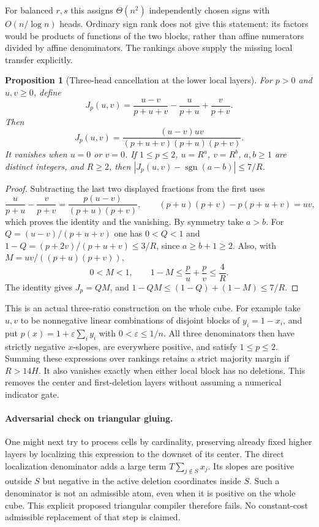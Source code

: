 \documentclass[11pt]{article}
\newtheorem{proposition}{Proposition}
\begin{document}
For balanced $r,s$ this assigns $\Theta(n^2)$ independently chosen
signs with $O(n/\log n)$ heads. Ordinary sign rank does not give this
statement: its factors would be products of functions of the two
blocks, rather than affine numerators divided by affine denominators.
The rankings above supply the missing local transfer explicitly.

\begin{proposition}[Three-head cancellation at the lower local layers]
For $p>0$ and $u,v\geq0$, define
\[
 J_p(u,v)=\frac{u-v}{p+u+v}-\frac{u}{p+u}+\frac{v}{p+v}.
\]
Then
\[
 J_p(u,v)=\frac{(u-v)uv}{(p+u+v)(p+u)(p+v)}.
\]
It vanishes when $u=0$ or $v=0$. If $1\leq p\leq2$,
$u=R^a$, $v=R^b$, $a,b\geq1$ are distinct integers, and $R\geq2$,
then
$|J_p(u,v)-\operatorname{sgn}(a-b)|\leq7/R$.
\end{proposition}
\begin{proof}
Subtracting the last two displayed fractions from the first uses
\[
 \frac{u}{p+u}-\frac{v}{p+v}
 =\frac{p(u-v)}{(p+u)(p+v)},\qquad
 (p+u)(p+v)-p(p+u+v)=uv,
\]
which proves the identity and the vanishing. By symmetry take $a>b$.
For $Q=(u-v)/(p+u+v)$ one has $0<Q<1$ and
$1-Q=(p+2v)/(p+u+v)\leq3/R$, since $a\geq b+1\geq2$.
Also, with $M=uv/((p+u)(p+v))$,
\[
 0<M<1,\qquad
 1-M\leq\frac{p}{u}+\frac{p}{v}\leq\frac4R.
\]
The identity gives $J_p=QM$, and
$1-QM\leq(1-Q)+(1-M)\leq7/R$.
\end{proof}

This is an actual three-ratio construction on the whole cube. For
example take $u,v$ to be nonnegative linear combinations of disjoint
blocks of $y_i=1-x_i$, and put
$p(x)=1+\varepsilon\sum_i y_i$ with $0<\varepsilon\leq1/n$.
All three denominators then have strictly negative $x$-slopes,
are everywhere positive, and satisfy $1\leq p\leq2$.
Summing these expressions over rankings retains a strict majority
margin if $R>14H$. It also vanishes exactly when either local block
has no deletions. This removes the center and first-deletion layers
without assuming a numerical indicator gate.

\paragraph{Adversarial check on triangular gluing.}
One might next try to process cells by cardinality, preserving already
fixed higher layers by localizing this expression to the downset of
its center. The direct localization denominator adds a large term
$T\sum_{j\notin S}x_j$. Its slopes are positive outside $S$ but
negative in the active deletion coordinates inside $S$. Such a
denominator is not an admissible atom, even when it is positive on
the whole cube. This explicit proposed triangular compiler therefore
fails. No constant-cost admissible replacement of that step is claimed.
\end{document}
